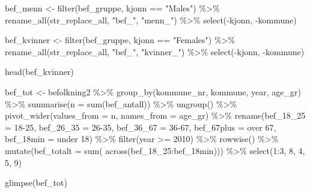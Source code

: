 \documentclass[
  norsk,
  letterpaper,
  DIV=11,
  numbers=noendperiod]{scrreprt}
\newenvironment{Shaded}{\begin{snugshade}}{\end{snugshade}}
\newcommand{\AttributeTok}[1]{\textcolor[rgb]{0.40,0.45,0.13}{#1}}
\newcommand{\DecValTok}[1]{\textcolor[rgb]{0.68,0.00,0.00}{#1}}
\newcommand{\FunctionTok}[1]{\textcolor[rgb]{0.28,0.35,0.67}{#1}}
\newcommand{\NormalTok}[1]{\textcolor[rgb]{0.00,0.23,0.31}{#1}}
\newcommand{\OtherTok}[1]{\textcolor[rgb]{0.00,0.23,0.31}{#1}}
\newcommand{\SpecialCharTok}[1]{\textcolor[rgb]{0.37,0.37,0.37}{#1}}
\newcommand{\StringTok}[1]{\textcolor[rgb]{0.13,0.47,0.30}{#1}}
\theoremstyle{definition}
\theoremstyle{remark}
\begin{document}
\begin{Shaded}
\begin{Highlighting}[]
\NormalTok{bef\_menn }\OtherTok{\textless{}{-}} \FunctionTok{filter}\NormalTok{(bef\_gruppe, kjonn }\SpecialCharTok{==} \StringTok{"Males"}\NormalTok{) }\SpecialCharTok{\%\textgreater{}\%} 
  \FunctionTok{rename\_all}\NormalTok{(str\_replace\_all, }\StringTok{"bef\_"}\NormalTok{, }\StringTok{"menn\_"}\NormalTok{) }\SpecialCharTok{\%\textgreater{}\%} 
  \FunctionTok{select}\NormalTok{(}\SpecialCharTok{{-}}\NormalTok{kjonn, }\SpecialCharTok{{-}}\NormalTok{kommune)}

\NormalTok{bef\_kvinner }\OtherTok{\textless{}{-}} \FunctionTok{filter}\NormalTok{(bef\_gruppe, kjonn }\SpecialCharTok{==} \StringTok{"Females"}\NormalTok{) }\SpecialCharTok{\%\textgreater{}\%} 
  \FunctionTok{rename\_all}\NormalTok{(str\_replace\_all, }\StringTok{"bef\_"}\NormalTok{, }\StringTok{"kvinner\_"}\NormalTok{) }\SpecialCharTok{\%\textgreater{}\%} 
  \FunctionTok{select}\NormalTok{(}\SpecialCharTok{{-}}\NormalTok{kjonn, }\SpecialCharTok{{-}}\NormalTok{kommune)}

\FunctionTok{head}\NormalTok{(bef\_kvinner)}


\NormalTok{bef\_tot }\OtherTok{\textless{}{-}}\NormalTok{ befolkning2 }\SpecialCharTok{\%\textgreater{}\%} 
  \FunctionTok{group\_by}\NormalTok{(kommune\_nr, kommune, year, age\_gr) }\SpecialCharTok{\%\textgreater{}\%} 
  \FunctionTok{summarise}\NormalTok{(}\AttributeTok{n =} \FunctionTok{sum}\NormalTok{(bef\_antall)) }\SpecialCharTok{\%\textgreater{}\%} 
  \FunctionTok{ungroup}\NormalTok{() }\SpecialCharTok{\%\textgreater{}\%} 
  \FunctionTok{pivot\_wider}\NormalTok{(}\AttributeTok{values\_from =}\NormalTok{ n, }\AttributeTok{names\_from =}\NormalTok{ age\_gr) }\SpecialCharTok{\%\textgreater{}\%} 
  \FunctionTok{rename}\NormalTok{(}\AttributeTok{bef\_18\_25 =} \StringTok{\textasciigrave{}}\AttributeTok{18{-}25}\StringTok{\textasciigrave{}}\NormalTok{, }\AttributeTok{bef\_26\_35 =} \StringTok{\textasciigrave{}}\AttributeTok{26{-}35}\StringTok{\textasciigrave{}}\NormalTok{, }\AttributeTok{bef\_36\_67 =} \StringTok{\textasciigrave{}}\AttributeTok{36{-}67}\StringTok{\textasciigrave{}}\NormalTok{, }
         \AttributeTok{bef\_67plus =} \StringTok{\textasciigrave{}}\AttributeTok{over 67}\StringTok{\textasciigrave{}}\NormalTok{, }\AttributeTok{bef\_18min =} \StringTok{\textasciigrave{}}\AttributeTok{under 18}\StringTok{\textasciigrave{}}\NormalTok{) }\SpecialCharTok{\%\textgreater{}\%} 
  \FunctionTok{filter}\NormalTok{(year }\SpecialCharTok{\textgreater{}=} \DecValTok{2010}\NormalTok{) }\SpecialCharTok{\%\textgreater{}\%} 
  \FunctionTok{rowwise}\NormalTok{() }\SpecialCharTok{\%\textgreater{}\%} 
  \FunctionTok{mutate}\NormalTok{(}\AttributeTok{bef\_totalt =} \FunctionTok{sum}\NormalTok{( }\FunctionTok{across}\NormalTok{(bef\_18\_25}\SpecialCharTok{:}\NormalTok{bef\_18min))) }\SpecialCharTok{\%\textgreater{}\%} 
  \FunctionTok{select}\NormalTok{(}\DecValTok{1}\SpecialCharTok{:}\DecValTok{3}\NormalTok{, }\DecValTok{8}\NormalTok{, }\DecValTok{4}\NormalTok{, }\DecValTok{5}\NormalTok{, }\DecValTok{9}\NormalTok{)}

\FunctionTok{glimpse}\NormalTok{(bef\_tot)}
\end{Highlighting}
\end{Shaded}
\end{document}

